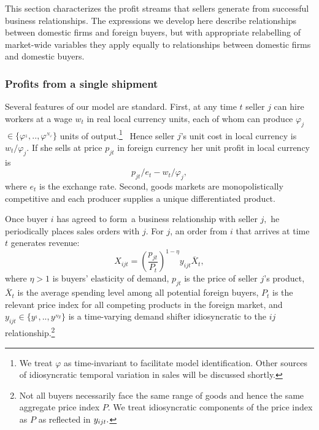 \documentclass[12pt]{article}
\begin{document}
This section characterizes the profit streams that sellers generate from
successful business relationships. The expressions we develop here describe
relationships between domestic firms and foreign buyers, but with
appropriate relabelling of market-wide variables they apply equally to
relationships between domestic firms and domestic buyers.

\subsubsection{Profits from a single shipment}

Several features of our model are standard. First, at any time $t$ seller $j$
can hire workers at a wage $w_{t}$ in real local currency units, each of
whom can produce $\varphi _{j}$ $\in \{\varphi ^{_{1}},..,\varphi
^{_{N_{\varphi }}}\}$ units of output.\footnote{%
We treat $\varphi $ as time-invariant to facilitate model identification.
Other sources of idiosyncratic temporal variation in sales will be discussed
shortly.\medskip} \ Hence seller $j$'s unit cost in local currency is $%
w_{t}/\varphi _{j}.$ If she sells at price $p_{jt}$ in foreign currency her
unit profit in local currency is%
\begin{equation}
p_{jt}/e_{t}-w_{t}/\varphi _{j},  \label{unit profit}
\end{equation}%
where $e_{t}$ is the exchange rate. Second, goods markets are
monopolistically competitive and each producer supplies a unique
differentiated product.

Once buyer $i$ has agreed to form\ a business relationship with seller $j,$
he periodically places sales orders with $j$. For $j$, an order from $i$
that arrives at time $t$ generates revenue:%
\begin{equation}
X_{ijt}=\left( \frac{p_{jt}}{P_{t}}\right) ^{1-\eta }y_{ijt}\overline{X}_{t},
\label{demand}
\end{equation}%
where $\eta >1$ is buyers' elasticity of demand, $p_{jt}$ is the price of
seller $j$'s product, $\overline{X}_{t}$ is the average spending level among
all potential foreign buyers, $P_{t}$ is the relevant price index for all
competing products in the foreign market, and $y_{ijt}\in
\{y^{_{1}},..,y^{_{Ny}}\}$ is a time-varying demand shifter idiosyncratic to
the $ij$ relationship.\footnote{%
Not all buyers necessarily face the same range of goods and hence the same
aggregate price index $P$. We treat idiosyncratic components of the price
index as $P$ as reflected in $y_{ijt}.\medskip $}
\end{document}
